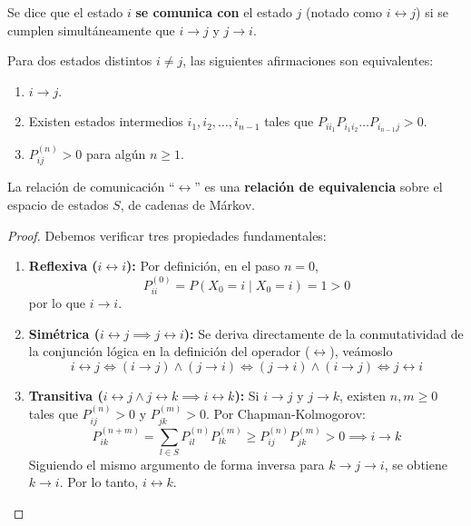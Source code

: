 \documentclass[10pt]{book}
\begin{document}
\begin{definicion}[Comunicación]
Se dice que el estado $i$ \textbf{se comunica con} el estado $j$ (notado como $i \longleftrightarrow j$) si se cumplen simultáneamente que $i \to j$ y $j \to i$.
\end{definicion}

\begin{teo}
    Para dos estados distintos $i \neq j$, las siguientes afirmaciones son equivalentes:
    \begin{enumerate}
        \item $i \to j$.
        \item Existen estados intermedios $i_1, i_2, \dots, i_{n-1}$ tales que $P_{i i_1} P_{i_1 i_2} \dots P_{i_{n-1} j} > 0$.
        \item $P_{ij}^{(n)} > 0$ para algún $n \geq 1$.
    \end{enumerate}
\end{teo}


\begin{prop}
    La relación de comunicación ``$\longleftrightarrow$'' es una \textbf{relación de equivalencia} sobre el espacio de estados $S$, de cadenas de Márkov.

\begin{proof}
    Debemos verificar tres propiedades fundamentales:
    \begin{enumerate}
        \item \textbf{Reflexiva ($i \longleftrightarrow i$):} Por definición, en el paso $n=0$, 
        $$P_{ii}^{(0)} = P(X_0 = i \mid X_0 = i) = 1 > 0$$ 
        por lo que $i \to i$.
        \item \textbf{Simétrica ($i \longleftrightarrow j \implies j \longleftrightarrow i$):} Se deriva directamente de la conmutatividad de la conjunción lógica en la definición del operador ($\longleftrightarrow$), veámoslo
        \begin{equation*}
            i \longleftrightarrow j \iff (i \to j) \land (j \to i) \iff (j \to i) \land (i \to j) \iff j \longleftrightarrow i
        \end{equation*}
        \item \textbf{Transitiva ($i \longleftrightarrow j \land j \longleftrightarrow k \implies i \longleftrightarrow k$):} 
        Si $i \to j$ y $j \to k$, existen $n, m \geq 0$ tales que $P_{ij}^{(n)} > 0$ y $P_{jk}^{(m)} > 0$. Por Chapman-Kolmogorov:
        \[
        P_{ik}^{(n+m)} = \sum_{l \in S} P_{il}^{(n)}P_{lk}^{(m)} \geq P_{ij}^{(n)}P_{jk}^{(m)} > 0 \implies i \to k
        \]
        Siguiendo el mismo argumento de forma inversa para $k \to j \to i$, se obtiene $k \to i$. Por lo tanto, $i \longleftrightarrow k$.
    \end{enumerate}
\end{proof}
\end{prop}
\end{document}
